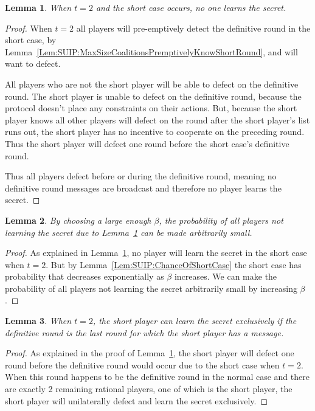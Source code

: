 \documentclass[12pt]{dalcsthesis}
\newtheorem{lemma}{Lemma}
\begin{document}
\begin{lemma}\label{Lem:SUIP:MinimumThresholdAndShortCaseMeansNoOneLearnsSecret}When $t=2$ and the short case occurs, no one learns the secret.\end{lemma}
\begin{proof}
When $t=2$ all players will pre-emptively detect the definitive round in the short case, by Lemma~\ref{Lem:SUIP:MaxSizeCoalitionsPremptivelyKnowShortRound}, and will want to defect.

All players who are not the short player will be able to defect on the definitive round. The short player is unable to defect on the definitive round, because the protocol doesn't place any constraints on their actions. But, because the short player knows all other players will defect on the round after the short player's list runs out, the short player has no incentive to cooperate on the preceding round. Thus the short player will defect one round before the short case's definitive round.

Thus all players defect before or during the definitive round, meaning no definitive round messages are broadcast and therefore no player learns the secret.
\end{proof}

\begin{lemma}\label{Lem:SUIP:NoPlayerLearningSecretIsReducible}By choosing a large enough $\beta$, the probability of all players not learning the secret due to Lemma~\ref{Lem:SUIP:MinimumThresholdAndShortCaseMeansNoOneLearnsSecret} can be made arbitrarily small.\end{lemma} 
\begin{proof}
As explained in Lemma~\ref{Lem:SUIP:MinimumThresholdAndShortCaseMeansNoOneLearnsSecret}, no player will learn the secret in the short case when $t=2$. But by Lemma~\ref{Lem:SUIP:ChanceOfShortCase} the short case has probability that decreases exponentially as $\beta$ increases. We can make the probability of all players not learning the secret arbitrarily small by increasing $\beta$.
\end{proof}

\begin{lemma}\label{Lem:SUIP:ShortPlayerMayLearnSecretExclusively}When $t=2$, the short player can learn the secret exclusively if the definitive round is the last round for which the short player has a message.\end{lemma} 
\begin{proof}
As explained in the proof of Lemma~\ref{Lem:SUIP:MinimumThresholdAndShortCaseMeansNoOneLearnsSecret}, the short player will defect one round before the definitive round would occur due to the short case when $t=2$. When this round happens to be the definitive round in the normal case and there are exactly 2 remaining rational players, one of which is the short player, the short player will unilaterally defect and learn the secret exclusively.
\end{proof}
\end{document}
